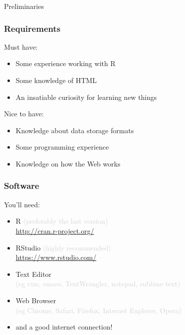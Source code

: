 \documentclass{beamer}\usepackage[]{graphicx}\usepackage[]{color}
\begin{document}

\begin{frame}
 \begin{center}
  \Huge{\textcolor{mandarina}{Preliminaries}}
 \end{center}
\end{frame}


\begin{frame}
\frametitle{Requirements}

\begin{block}{Must have:}
 \begin{itemize}
  \item Some experience working with R
  \item Some knowledge of HTML
  \item An insatiable curiosity for learning new things
 \end{itemize}
\end{block}

\begin{block}{Nice to have:}
 \begin{itemize}
  \item Knowledge about data storage formats
  \item Some programming experience
  \item Knowledge on how the Web works
 \end{itemize}
\end{block}

\end{frame}


\begin{frame}
\frametitle{Software}

\begin{block}{You'll need:}
 \begin{itemize}
  \item R \textcolor{lightgray}{(preferably the last version)} \\ \url{http://cran.r-project.org/}
  \item RStudio \textcolor{lightgray}{(highly recommended)} \\ \url{https://www.rstudio.com/}
  \item Text Editor \\ \textcolor{lightgray}{(eg vim, emacs, TextWrangler, notepad, sublime text)}
  \item Web Browser \\ \textcolor{lightgray}{(eg Chrome, Safari, Firefox, Internet Explorer, Opera)}
  \item and a good internet connection!
 \end{itemize}
\end{block}

\end{frame}
\end{document}
